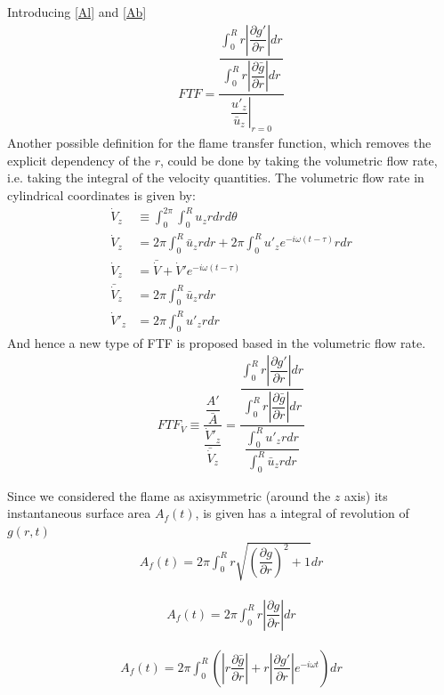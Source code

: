 Introducing \ref{Al} and \ref{Ab}
\begin{align*}
FTF= \dfrac{\dfrac{\int_0^R r \left| \dfrac{\partial g'}{\partial r} \right| dr}{\int_0^R r \left|\dfrac{\partial \bar{g}}{\partial r}\right| dr}}{ \left.\dfrac{u'_z}{\bar{u}_z}\right|_{r=0}}
\end{align*}
Another possible definition for the flame transfer function, which removes the explicit dependency of the $r$, could be done by taking the volumetric flow rate, i.e. taking the integral of the velocity quantities.
The volumetric flow rate in cylindrical coordinates is given by:
\begin{align*}
\dot{V}_z&\equiv \int_0^{2\pi} \int_0^R u_z r dr d\theta \\
\dot{V}_z&= 2 \pi \int_0^R \bar{u}_z r dr + 2\pi \int_0^R u'_z e^{-i \omega (t-\tau)}r dr \\
\dot{V}_z&= \bar{\dot{V}}  + \dot{V}'e^{-i \omega (t-\tau)}\\
\bar{\dot{V}}_z&=2 \pi \int_0^R \bar{u}_z r dr\\
\dot{V}'_z&= 2\pi \int_0^R u'_z r dr 
\end{align*}
And hence a new type of FTF is proposed based in the volumetric flow rate.
\begin{align*}
FTF_{\dot{V}}\equiv \dfrac{\dfrac{A'}{\bar{A}}}{\dfrac{\dot{V}'_z}{\bar{\dot{V}}_z}}=\dfrac{\dfrac{\int_0^R r \left| \dfrac{\partial g'}{\partial r} \right| dr}{\int_0^R r \left|\dfrac{\partial \bar{g}}{\partial r}\right| dr}}{\dfrac{\int_0^R u'_z r dr}{\int_0^R \bar{u}_z r dr}}
\end{align*}



Since we considered the flame as axisymmetric (around the $z$ axis) its instantaneous surface area $A_f(t)$, is given has a integral of revolution of $g(r,t)$
\begin{align}
A_f(t)=2 \pi \int_0^R r\sqrt{\left(\dfrac{\partial g}{\partial r}\right)^2+1} dr
\end{align}

\begin{align*}
A_f(t)=2\pi \int_0^R r \left|\dfrac{\partial g}{\partial r}\right|  dr 
\end{align*}		

\begin{align}
A_f(t)=2\pi \int_0^R \left( \left| r \dfrac{\partial \bar{g}}{\partial r}\right| + r \left| \dfrac{\partial g'}{\partial r} \right|  e^{-i\omega t} \right) dr 
\end{align}

